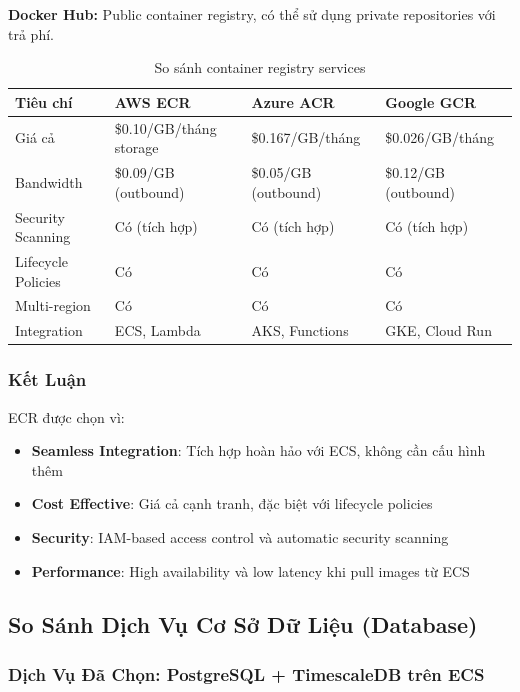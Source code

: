 \textbf{Docker Hub:} Public container registry, có thể sử dụng private repositories với trả phí.

\begin{table}[H]
\centering
\caption{So sánh container registry services}
\label{tab:so-sanh-storage}
\begin{tabular}{|p{2.5cm}|p{3.5cm}|p{3.5cm}|p{3.5cm}|}
\hline
\textbf{Tiêu chí} & \textbf{AWS ECR} & \textbf{Azure ACR} & \textbf{Google GCR} \\
\hline
Giá cả & \$0.10/GB/tháng storage & \$0.167/GB/tháng & \$0.026/GB/tháng \\
\hline
Bandwidth & \$0.09/GB (outbound) & \$0.05/GB (outbound) & \$0.12/GB (outbound) \\
\hline
Security Scanning & Có (tích hợp) & Có (tích hợp) & Có (tích hợp) \\
\hline
Lifecycle Policies & Có & Có & Có \\
\hline
Multi-region & Có & Có & Có \\
\hline
Integration & ECS, Lambda & AKS, Functions & GKE, Cloud Run \\
\hline
\end{tabular}
\end{table}

\subsubsection{Kết Luận}

ECR được chọn vì:
\begin{itemize}
    \item \textbf{Seamless Integration}: Tích hợp hoàn hảo với ECS, không cần cấu hình thêm
    \item \textbf{Cost Effective}: Giá cả cạnh tranh, đặc biệt với lifecycle policies
    \item \textbf{Security}: IAM-based access control và automatic security scanning
    \item \textbf{Performance}: High availability và low latency khi pull images từ ECS
\end{itemize}

\subsection{So Sánh Dịch Vụ Cơ Sở Dữ Liệu (Database)}

\subsubsection{Dịch Vụ Đã Chọn: PostgreSQL + TimescaleDB trên ECS}

